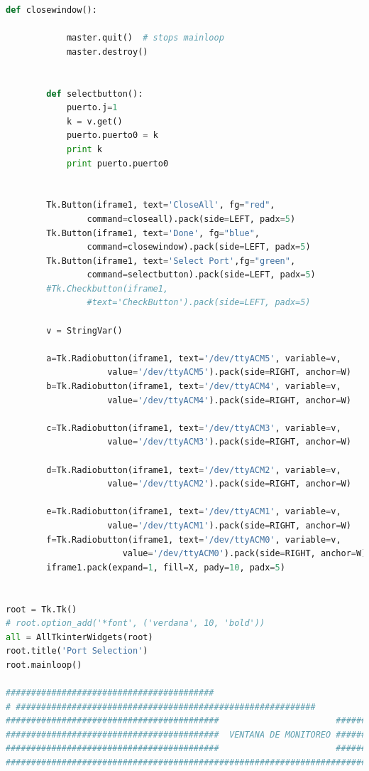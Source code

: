 {\begin{lstlisting}[language=python]
        def closewindow():

            master.quit()  # stops mainloop
            master.destroy()


        def selectbutton():
            puerto.j=1
            k = v.get()
            puerto.puerto0 = k
            print k
            print puerto.puerto0


        Tk.Button(iframe1, text='CloseAll', fg="red",
				command=closeall).pack(side=LEFT, padx=5)
        Tk.Button(iframe1, text='Done', fg="blue",
				command=closewindow).pack(side=LEFT, padx=5)
        Tk.Button(iframe1, text='Select Port',fg="green",
				command=selectbutton).pack(side=LEFT, padx=5)
        #Tk.Checkbutton(iframe1,
				#text='CheckButton').pack(side=LEFT, padx=5)

        v = StringVar()

        a=Tk.Radiobutton(iframe1, text='/dev/ttyACM5', variable=v,
                    value='/dev/ttyACM5').pack(side=RIGHT, anchor=W)
        b=Tk.Radiobutton(iframe1, text='/dev/ttyACM4', variable=v,
                    value='/dev/ttyACM4').pack(side=RIGHT, anchor=W)

        c=Tk.Radiobutton(iframe1, text='/dev/ttyACM3', variable=v,
                    value='/dev/ttyACM3').pack(side=RIGHT, anchor=W)

        d=Tk.Radiobutton(iframe1, text='/dev/ttyACM2', variable=v,
                    value='/dev/ttyACM2').pack(side=RIGHT, anchor=W)

        e=Tk.Radiobutton(iframe1, text='/dev/ttyACM1', variable=v,
                    value='/dev/ttyACM1').pack(side=RIGHT, anchor=W)
        f=Tk.Radiobutton(iframe1, text='/dev/ttyACM0', variable=v,
                       value='/dev/ttyACM0').pack(side=RIGHT, anchor=W)
        iframe1.pack(expand=1, fill=X, pady=10, padx=5)


root = Tk.Tk()
# root.option_add('*font', ('verdana', 10, 'bold'))
all = AllTkinterWidgets(root)
root.title('Port Selection')
root.mainloop()

#########################################
# ###########################################################
##########################################                       ###################################
##########################################  VENTANA DE MONITOREO ###################################
##########################################                       ###################################
####################################################################################################


\end{lstlisting}}
